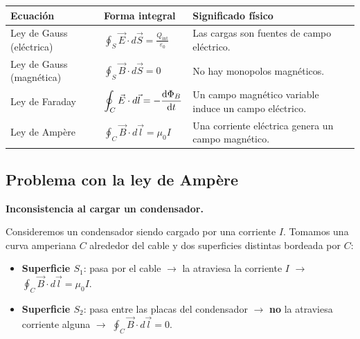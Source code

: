 \documentclass[12pt,a4paper]{article}
\begin{document}
\begin{table}[H]
  \centering
  \begin{tabularx}{\textwidth}{@{}l l X@{}}
    \toprule
    \textbf{Ecuación} & \textbf{Forma integral} &
    \textbf{Significado físico} \\
    \midrule
    Ley de Gauss (eléctrica)
    & \(\displaystyle \oint_S \vec E \cdot d\vec S
       = \frac{Q_{\text{int}}}{\varepsilon_0}\)
    & Las cargas son fuentes de campo eléctrico. \\[8pt]
    Ley de Gauss (magnética)
    & \(\displaystyle \oint_S \vec B \cdot d\vec S = 0\)
    & No hay monopolos magnéticos. \\[8pt]
    Ley de Faraday
    & \(\displaystyle \oint_C \vec E \cdot d\vec l
       = -\dv{\Phi_B}{t}\)
    & Un campo magnético variable induce un campo
      eléctrico. \\[8pt]
    Ley de Ampère
    & \(\displaystyle \oint_C \vec B \cdot d\vec l
       = \mu_0 I\)
    & Una corriente eléctrica genera un campo
      magnético. \\
    \bottomrule
  \end{tabularx}
\end{table}

\subsection{Problema con la ley de Ampère}

\textbf{Inconsistencia al cargar un condensador.}

Consideremos un condensador siendo cargado por una corriente \(I\).
Tomamos una curva amperiana \(C\) alrededor del cable y dos
superficies distintas bordeada por \(C\):

\begin{itemize}
  \item \textbf{Superficie \(S_1\)}: pasa por el cable
        \(\rightarrow\) la atraviesa la corriente \(I\)
        \(\rightarrow\) \(\displaystyle \oint_C \vec B \cdot d\vec l
        = \mu_0 I\).
  \item \textbf{Superficie \(S_2\)}: pasa entre las placas del
        condensador \(\rightarrow\) \textbf{no} la atraviesa corriente
        alguna \(\rightarrow\)
        \(\displaystyle \oint_C \vec B \cdot d\vec l = 0\).
\end{itemize}
\end{document}
